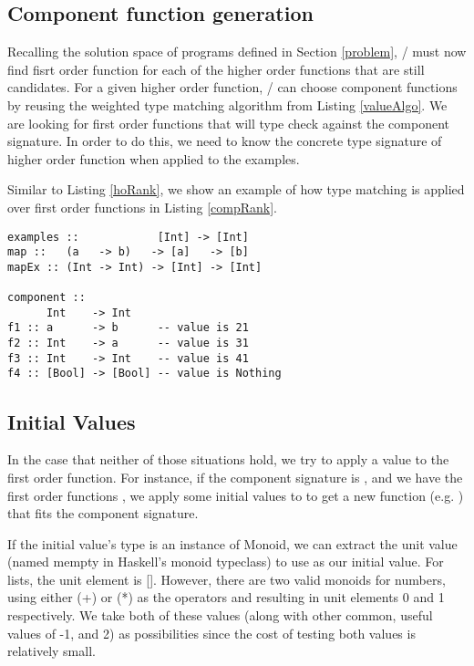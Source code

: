\subsection{Component function generation}\label{makeFxns}

Recalling the solution space of programs defined in Section \ref{problem}, \ourTool/ must now find fisrt order function for each of the higher order functions that are still candidates.
For a given higher order function, \ourTool/ can choose component functions by reusing the weighted type matching algorithm from Listing \ref{valueAlgo}.
We are looking for first order functions that will type check against the component signature.
In order to do this, we need to know the concrete type signature of higher order function when applied to the examples.

Similar to Listing \ref{hoRank}, we show an example of how type matching is applied over first order functions in Listing \ref{compRank}.

\begin{lstlisting}[caption=Ranking component function,label=comprank]
examples ::            [Int] -> [Int]
map ::   (a   -> b)   -> [a]   -> [b]
mapEx :: (Int -> Int) -> [Int] -> [Int]

component ::
      Int    -> Int
f1 :: a      -> b      -- value is 21
f2 :: Int    -> a      -- value is 31
f3 :: Int    -> Int    -- value is 41
f4 :: [Bool] -> [Bool] -- value is Nothing
\end{lstlisting}

\subsection{Initial Values}

In the case that neither of those situations hold, we try to apply a value to the first order function.
For instance, if the component signature is , and we have the first order functions , we apply some initial values to \codeinline{(+)} to get a new function (e.g. ) that fits the component signature.

If the initial value's type is an instance of Monoid, we can extract the unit value (named mempty in Haskell's monoid typeclass\cite{monoid}) to use as our initial value. For lists, the unit element is []. However, there are two valid monoids for numbers, using either (+) or (*) as the operators and resulting in unit elements 0 and 1 respectively. We take both of these values (along with other common, useful values of -1, and 2) as possibilities since the cost of testing both values is relatively small.

